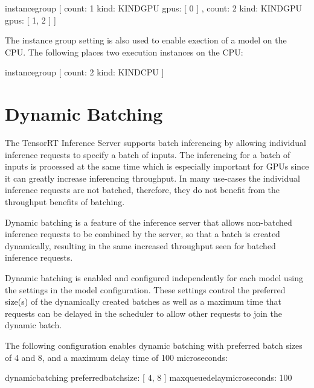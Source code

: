 \documentclass[letterpaper,10pt,english]{sphinxmanual}
\begin{document}
\begin{sphinxVerbatim}[commandchars=\\\{\}]
instance\PYGZus{}group [
  \PYGZob{}
    count: 1
    kind: KIND\PYGZus{}GPU
    gpus: [ 0 ]
  \PYGZcb{},
  \PYGZob{}
    count: 2
    kind: KIND\PYGZus{}GPU
    gpus: [ 1, 2 ]
  \PYGZcb{}
]
\end{sphinxVerbatim}

The instance group setting is also used to enable exection of a model
on the CPU. The following places two execution instances on the CPU:

\begin{sphinxVerbatim}[commandchars=\\\{\}]
instance\PYGZus{}group [
  \PYGZob{}
    count: 2
    kind: KIND\PYGZus{}CPU
  \PYGZcb{}
]
\end{sphinxVerbatim}


\section{Dynamic Batching}
\label{\detokenize{model_configuration:dynamic-batching}}\label{\detokenize{model_configuration:section-dynamic-batching}}
The TensorRT Inference Server supports batch inferencing by allowing
individual inference requests to specify a batch of inputs. The
inferencing for a batch of inputs is processed at the same time which
is especially important for GPUs since it can greatly increase
inferencing throughput. In many use-cases the individual inference
requests are not batched, therefore, they do not benefit from the
throughput benefits of batching.

Dynamic batching is a feature of the inference server that allows
non-batched inference requests to be combined by the server, so that a
batch is created dynamically, resulting in the same increased
throughput seen for batched inference requests.

Dynamic batching is enabled and configured independently for each
model using the  settings in the model
configuration. These settings control the preferred size(s) of the
dynamically created batches as well as a maximum time that requests
can be delayed in the scheduler to allow other requests to join the
dynamic batch.

The following configuration enables dynamic batching with preferred
batch sizes of 4 and 8, and a maximum delay time of 100 microseconds:

\begin{sphinxVerbatim}[commandchars=\\\{\}]
dynamic\PYGZus{}batching \PYGZob{}
  preferred\PYGZus{}batch\PYGZus{}size: [ 4, 8 ]
  max\PYGZus{}queue\PYGZus{}delay\PYGZus{}microseconds: 100
\PYGZcb{}
\end{sphinxVerbatim}
\end{document}
